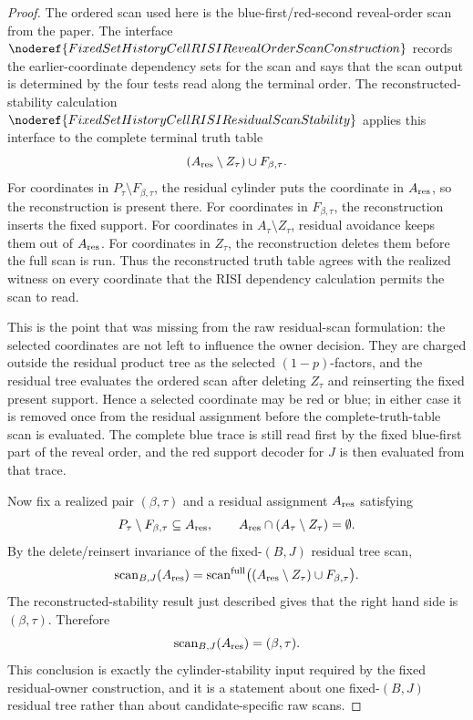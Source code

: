 \begin{proof}
The ordered scan used here is the blue-first/red-second reveal-order scan
from the paper.  The interface
\(\noderef{FixedSetHistoryCellRISIRevealOrderScanConstruction}\) records the
earlier-coordinate dependency sets for the scan and says that the scan output
is determined by the four tests read along the terminal order.  The
reconstructed-stability calculation
\(\noderef{FixedSetHistoryCellRISIResidualScanStability}\) applies this
interface to the complete terminal truth table
\[
(A_{\rm res}\setminus Z_\tau)\cup F_{\beta,\tau}.
\]
For coordinates in \(P_\tau\setminus F_{\beta,\tau}\), the residual cylinder
puts the coordinate in \(A_{\rm res}\), so the reconstruction is present
there.  For coordinates in \(F_{\beta,\tau}\), the reconstruction inserts
the fixed support.  For coordinates in \(A_\tau\setminus Z_\tau\), residual
avoidance keeps them out of \(A_{\rm res}\).  For coordinates in
\(Z_\tau\), the reconstruction deletes them before the full scan is run.
Thus the reconstructed truth table agrees with the realized witness on every
coordinate that the RISI dependency calculation permits the scan to read.

This is the point that was missing from the raw residual-scan formulation:
the selected coordinates are not left to influence the owner decision.  They
are charged outside the residual product tree as the selected
\((1-p)\)-factors, and the residual tree evaluates the ordered scan after
deleting \(Z_\tau\) and reinserting the fixed present support.  Hence a
selected coordinate may be red or blue; in either case it is removed once
from the residual assignment before the complete-truth-table scan is
evaluated.  The complete blue trace is still read first by the fixed
blue-first part of the reveal order, and the red support decoder for \(J\)
is then evaluated from that trace.

Now fix a realized pair \((\beta,\tau)\) and a residual assignment
\(A_{\rm res}\) satisfying
\[
P_\tau\setminus F_{\beta,\tau}\subseteq A_{\rm res},
\qquad
A_{\rm res}\cap(A_\tau\setminus Z_\tau)=\emptyset .
\]
By the delete/reinsert invariance of the fixed-\((B,J)\) residual tree scan,
\[
\operatorname{scan}_{B,J}(A_{\rm res})
 =
\operatorname{scan}^{\mathrm{full}}
  \bigl((A_{\rm res}\setminus Z_\tau)\cup F_{\beta,\tau}\bigr).
\]
The reconstructed-stability result just described gives that the right hand
side is \((\beta,\tau)\).  Therefore
\[
\operatorname{scan}_{B,J}(A_{\rm res})=(\beta,\tau).
\]
This conclusion is exactly the cylinder-stability input required by the
fixed residual-owner construction, and it is a statement about one
fixed-\((B,J)\) residual tree rather than about candidate-specific raw scans.
\end{proof}
